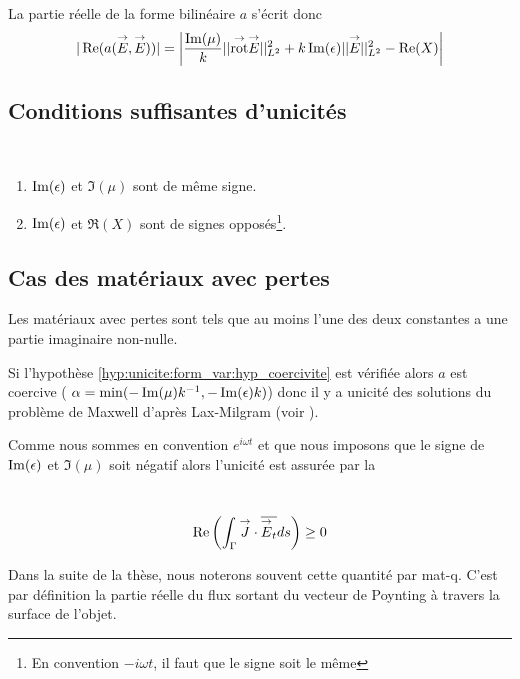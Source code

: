   La partie réelle de la forme bilinéaire \(a\) s'écrit donc
  \begin{equation}
    \label{eq:unicite:form_var:decomp_form_bilin_1}
    |\operatorname{Re}(a({\overset{\rightarrow}{E}},{\overset{\rightarrow}{E}}))| = \left|\dfrac{\operatorname{Im}(\mu)}{k} || {{\overset{\rightarrow}{\operatorname{rot}}}} {\overset{\rightarrow}{E}} ||_{L^2}^2  + k \operatorname{Im}(\epsilon) || {\overset{\rightarrow}{E}} ||_{L^2}^2
    - \operatorname{Re}(X)\right|
  \end{equation}

\subsection{Conditions suffisantes d'unicités}

  \begin{hyp}\label{hyp:unicite:form_var:hyp_coercivite}
    ~{}

    \begin{enumerate}
      \item \(\operatorname{Im}(\epsilon)\) et \(\Im(\mu)\) sont de même signe.
      \item \(\operatorname{Im}(\epsilon)\) et \(\Re(X)\) sont de signes opposés\footnote{En convention \(-i\omega t\), il faut que le signe soit le même}.
    \end{enumerate}
  \end{hyp}

\subsection{Cas des matériaux avec pertes}

  Les matériaux avec pertes sont tels que au moins l'une des deux constantes a une partie imaginaire non-nulle.

  Si l'hypothèse \ref{hyp:unicite:form_var:hyp_coercivite} est vérifiée alors \(a\) est coercive ( \(\alpha = \min(-\operatorname{Im}(\mu)k^{-1},-\operatorname{Im}(\epsilon)k)\)) donc il y a unicité des solutions du problème de Maxwell d'après Lax-Milgram (voir \cite{cessenat_mathematical_1996}).

  Comme nous sommes en convention \(e^{i\omega t}\) et que nous imposons que le signe de \(\operatorname{Im}(\epsilon)\) et \(\Im(\mu)\) soit négatif
  alors l'unicité est assurée par la
  \begin{defn}~\\
    \begin{equation}\label{eq:unicite:form_var:cgu}
      \operatorname{Re}\left(\int_\Gamma {\overset{\rightarrow}{J}} \cdot {\overline{{\overset{\rightarrow}{E}}_t}} ds\right) \ge 0
    \end{equation}
  \end{defn}
  Dans la suite de la thèse, nous noterons souvent cette quantité par \gls{mat-q}. C'est par définition la partie réelle du flux sortant du vecteur de Poynting à travers la surface de l'objet. 

